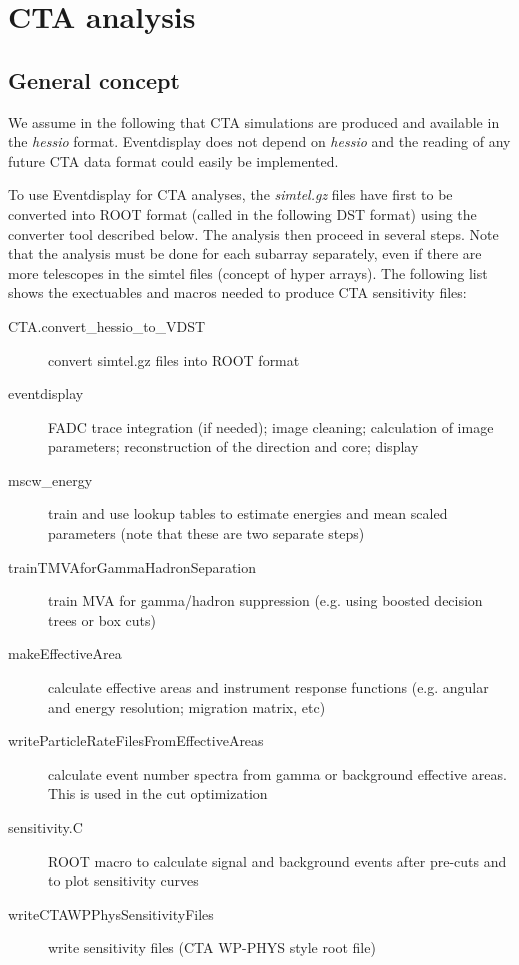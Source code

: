 \documentclass[titlepage,a4paper,twoside,11pt]{report}
\begin{document}
%
%

\chapter{CTA analysis}

\section{General concept}

We assume in the following that CTA simulations are produced and available in the {\it hessio} format. 
Eventdisplay does not depend on {\it hessio} and the reading of any future CTA data format could easily be implemented.

To use Eventdisplay for CTA analyses, the {\it simtel.gz} files have first to be converted into ROOT format (called in the following DST format) using the converter tool described below. 
The analysis then proceed in several steps.
Note that the analysis must be done for each subarray separately, even if there are more telescopes in the simtel files (concept of hyper arrays).
The following list shows the exectuables and macros needed to produce CTA sensitivity files:

\begin{description}
\item[CTA.convert\_hessio\_to\_VDST]
        convert simtel.gz files into ROOT format

\item[eventdisplay]
	FADC trace integration (if needed); image cleaning; calculation of image parameters; reconstruction of the direction and core; display

\item[mscw\_energy]
        train and use lookup tables to estimate energies and mean scaled parameters (note that these are two separate steps)
        
\item[trainTMVAforGammaHadronSeparation]
        train MVA for gamma/hadron suppression (e.g. using boosted decision trees or box cuts)

\item[makeEffectiveArea]
        calculate effective areas and instrument response functions (e.g. angular and energy resolution; migration matrix, etc)

\item[writeParticleRateFilesFromEffectiveAreas]
        calculate event number spectra from gamma or background effective areas. This is used in the cut optimization 

\item[sensitivity.C]
        ROOT macro to calculate signal and background events after pre-cuts and to plot sensitivity curves

\item[writeCTAWPPhysSensitivityFiles]
        write sensitivity files (CTA WP-PHYS style root file)
        
\end{description}
\end{document}
